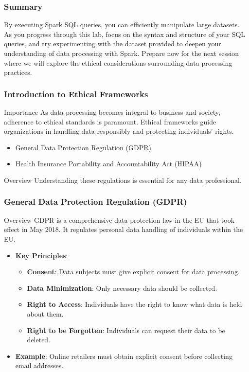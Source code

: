 \documentclass[aspectratio=169]{beamer}
\begin{document}
\begin{frame}
  \frametitle{Summary}
  By executing Spark SQL queries, you can efficiently manipulate large datasets. As you progress through this lab, focus on the syntax and structure of your SQL queries, and try experimenting with the dataset provided to deepen your understanding of data processing with Spark.
  Prepare now for the next session where we will explore the ethical considerations surrounding data processing practices.
\end{frame}

\begin{frame}[fragile]
    \frametitle{Introduction to Ethical Frameworks}
    \begin{block}{Importance}
        As data processing becomes integral to business and society, adherence to ethical standards is paramount. Ethical frameworks guide organizations in handling data responsibly and protecting individuals' rights.
    \end{block}
    \begin{itemize}
        \item General Data Protection Regulation (GDPR)
        \item Health Insurance Portability and Accountability Act (HIPAA)
    \end{itemize}
    \begin{block}{Overview}
        Understanding these regulations is essential for any data professional.
    \end{block}
\end{frame}

\begin{frame}[fragile]
    \frametitle{General Data Protection Regulation (GDPR)}
    \begin{block}{Overview}
        GDPR is a comprehensive data protection law in the EU that took effect in May 2018. It regulates personal data handling of individuals within the EU.
    \end{block}
    \begin{itemize}
        \item \textbf{Key Principles}:
            \begin{itemize}
                \item \textbf{Consent}: Data subjects must give explicit consent for data processing.
                \item \textbf{Data Minimization}: Only necessary data should be collected.
                \item \textbf{Right to Access}: Individuals have the right to know what data is held about them.
                \item \textbf{Right to be Forgotten}: Individuals can request their data to be deleted.
            \end{itemize}
        \item \textbf{Example}: Online retailers must obtain explicit consent before collecting email addresses.
    \end{itemize}
\end{frame}
\end{document}
